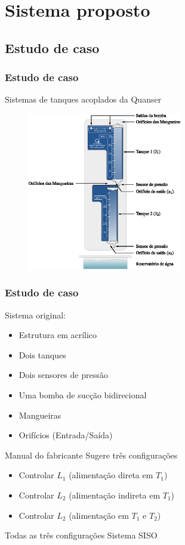 \documentclass{beamer}
\begin{document}
\section{Sistema proposto}
\subsection{Estudo de caso}
\begin{frame}
    \frametitle{Estudo de caso}

    Sistemas de tanques acoplados da Quanser\reg

\begin{figure}[htb]
\centering
    \includegraphics[width=0.6\textwidth]{imgs/sistema/eps/tanques}
\end{figure}
\end{frame}

\begin{frame}
    \frametitle{Estudo de caso}

    Sistema original:

\begin{itemize}
    \item Estrutura em acrílico
    \item Dois tanques
    \item Dois sensores de pressão
    \item Uma bomba de sucção bidirecional
    \item Mangueiras
    \item Orifícios (Entrada/Saída)
\end{itemize}

    Manual do fabricante \implica Sugere três configurações

\begin{itemize}
    \item Controlar $L_1$ (alimentação direta em $T_1$)
    \item Controlar $L_2$ (alimentação indireta em $T_1$)
    \item Controlar $L_2$ (alimentação em $T_1$ e $T_2$)
\end{itemize}

    Todas as três configurações \implica Sistema SISO
\end{frame}
\end{document}
